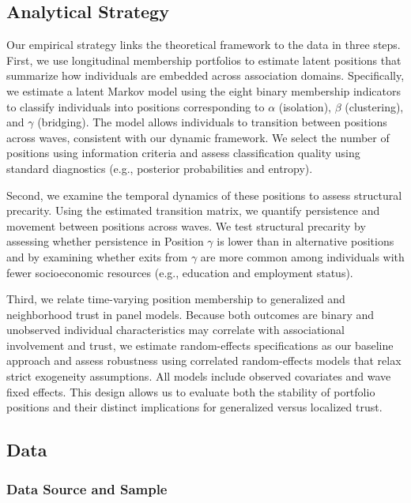 \subsection{Analytical Strategy}

Our empirical strategy links the theoretical framework to the data in three steps. First, we use longitudinal membership portfolios to estimate latent positions that summarize how individuals are embedded across association domains. Specifically, we estimate a latent Markov model using the eight binary membership indicators to classify individuals into positions corresponding to $\alpha$ (isolation), $\beta$ (clustering), and $\gamma$ (bridging). The model allows individuals to transition between positions across waves, consistent with our dynamic framework. We select the number of positions using information criteria and assess classification quality using standard diagnostics (e.g., posterior probabilities and entropy).

Second, we examine the temporal dynamics of these positions to assess structural precarity. Using the estimated transition matrix, we quantify persistence and movement between positions across waves. We test structural precarity by assessing whether persistence in Position $\gamma$ is lower than in alternative positions and by examining whether exits from $\gamma$ are more common among individuals with fewer socioeconomic resources (e.g., education and employment status).

Third, we relate time-varying position membership to generalized and neighborhood trust in panel models. Because both outcomes are binary and unobserved individual characteristics may correlate with associational involvement and trust, we estimate random-effects specifications as our baseline approach and assess robustness using correlated random-effects models that relax strict exogeneity assumptions. All models include observed covariates and wave fixed effects. This design allows us to evaluate both the stability of portfolio positions and their distinct implications for generalized versus localized trust.


\subsection{Data}

\subsubsection{Data Source and Sample}

